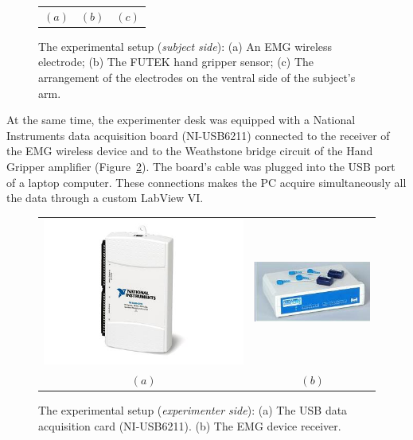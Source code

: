 \begin{figure}[!t]
\begin{tabular}{ccc}
    $(a)$ & $(b)$ & $(c)$ \\
  \end{tabular}
  \caption{The experimental setup (\textit{subject side}): (a) An EMG wireless electrode; (b) The FUTEK hand gripper sensor; (c) The arrangement of the electrodes on the ventral side of the subject's arm.}
  \label{fig:SubjSetup}
\end{figure}

At the same time, the experimenter desk was equipped with a National Instruments data acquisition board (NI-USB6211) connected to the receiver of the EMG wireless device and to the Weathstone bridge circuit of the Hand Gripper amplifier (Figure~\ref{fig:ExpSetup}). The board's cable was plugged into the USB port of a laptop computer.
These connections makes the PC acquire simultaneously all the data through a custom LabView VI.
  
\begin{figure}[!t] \centering
  \begin{tabular}{cc}
   \includegraphics[height=0.16\textheight]{figs/NI-6211} &
    \includegraphics[height=0.16\textheight]{figs/Zero_Base} \\
  $(a)$ & $(b)$\\
  \end{tabular}
  \caption{The experimental setup (\textit{experimenter side}): (a) The USB data acquisition card (NI-USB6211). (b) The EMG device receiver.}
  \label{fig:ExpSetup}
\end{figure}

